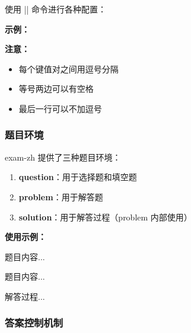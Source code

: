  使用 |\examsetup| 命令进行各种配置：

\begin{latexcode}
\end{latexcode}

\textbf{示例：}
\begin{latexcode}
\end{latexcode}

\textbf{注意：}
\begin{itemize}
  \item 每个键值对之间用逗号分隔
  \item 等号两边可以有空格
  \item 最后一行可以不加逗号
\end{itemize}

\subsubsection{题目环境}

exam-zh 提供了三种题目环境：

\begin{enumerate}
  \item \textbf{question}：用于选择题和填空题
  \item \textbf{problem}：用于解答题
  \item \textbf{solution}：用于解答过程（problem 内部使用）
\end{enumerate}

\textbf{使用示例：}
\begin{latexcode}
  \begin{question}[points = 5]
    题目内容...
  \end{question}

  \begin{problem}[points = 10]
    题目内容...
    \begin{solution}
      解答过程...
    \end{solution}
  \end{problem}
\end{latexcode}

\subsubsection{答案控制机制}

